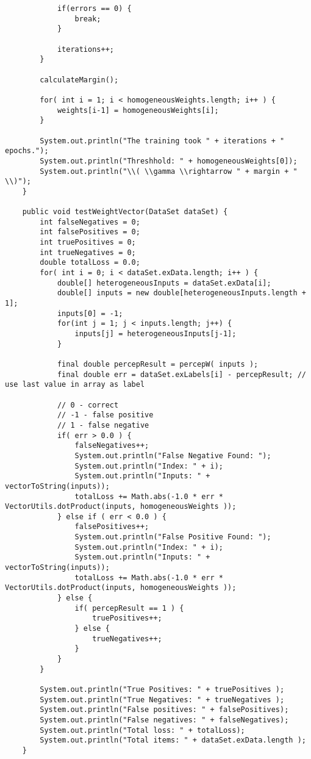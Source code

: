 \begin{lstlisting}
			if(errors == 0) {
				break;
			}
			
			iterations++;
		}
		
		calculateMargin();
		
		for( int i = 1; i < homogeneousWeights.length; i++ ) {
			weights[i-1] = homogeneousWeights[i];
		}
		
		System.out.println("The training took " + iterations + " epochs.");
		System.out.println("Threshhold: " + homogeneousWeights[0]);
		System.out.println("\\( \\gamma \\rightarrow " + margin + " \\)");
	}
	
	public void testWeightVector(DataSet dataSet) {
		int falseNegatives = 0;
		int falsePositives = 0;
		int truePositives = 0;
		int trueNegatives = 0;
		double totalLoss = 0.0;
		for( int i = 0; i < dataSet.exData.length; i++ ) {
			double[] heterogeneousInputs = dataSet.exData[i];
			double[] inputs = new double[heterogeneousInputs.length + 1];
			inputs[0] = -1;
			for(int j = 1; j < inputs.length; j++) {
				inputs[j] = heterogeneousInputs[j-1];
			}
			
			final double percepResult = percepW( inputs );
			final double err = dataSet.exLabels[i] - percepResult; // use last value in array as label
			
			// 0 - correct
			// -1 - false positive
			// 1 - false negative
			if( err > 0.0 ) {
				falseNegatives++;
				System.out.println("False Negative Found: ");
				System.out.println("Index: " + i);
				System.out.println("Inputs: " + vectorToString(inputs));
				totalLoss += Math.abs(-1.0 * err * VectorUtils.dotProduct(inputs, homogeneousWeights ));
			} else if ( err < 0.0 ) {
				falsePositives++;
				System.out.println("False Positive Found: ");
				System.out.println("Index: " + i);
				System.out.println("Inputs: " + vectorToString(inputs));
				totalLoss += Math.abs(-1.0 * err * VectorUtils.dotProduct(inputs, homogeneousWeights ));
			} else {
				if( percepResult == 1 ) {
					truePositives++;
				} else {
					trueNegatives++;
				}
			}
		}
		
		System.out.println("True Positives: " + truePositives );
		System.out.println("True Negatives: " + trueNegatives );
		System.out.println("False positives: " + falsePositives);
		System.out.println("False negatives: " + falseNegatives);
		System.out.println("Total loss: " + totalLoss);
		System.out.println("Total items: " + dataSet.exData.length );
	}
	

\end{lstlisting}
